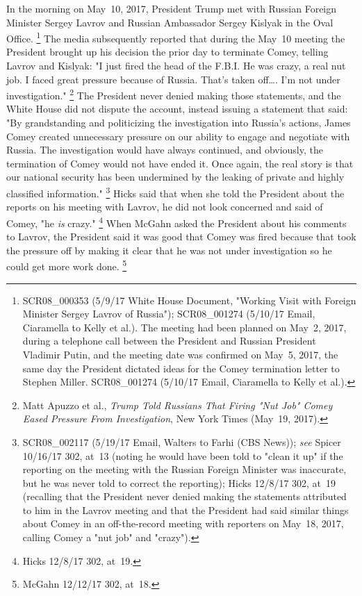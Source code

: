 In the morning on May~10, 2017, President Trump met with Russian Foreign Minister Sergey Lavrov and Russian Ambassador Sergey Kislyak in the Oval Office.%
\footnote{SCR08\_000353 (5/9/17 White House Document, "Working Visit with Foreign Minister Sergey Lavrov of Russia");
SCR08\_001274 (5/10/17 Email, Ciaramella to Kelly et al.).
The meeting had been planned on May~2, 2017, during a telephone call between the President and Russian President Vladimir Putin, and the meeting date was confirmed on May~5, 2017, the same day the President dictated ideas for the Comey termination letter to Stephen Miller.
SCR08\_001274 (5/10/17 Email, Ciaramella to Kelly et al.).}
The media subsequently reported that during the May~10 meeting the President brought up his decision the prior day to terminate Comey, telling Lavrov and Kislyak:
"I just fired the head of the F.B.I\null.
He was crazy, a real nut job.
I faced great pressure because of Russia.
That's taken off\dots.
I'm not under investigation."%
\footnote{Matt Apuzzo et al., \textit{Trump Told Russians That Firing "Nut Job" Comey Eased Pressure From Investigation}, New York Times (May~19, 2017).}
The President never denied making those statements, and the White House did not dispute the account, instead issuing a statement that said:
"By grandstanding and politicizing the investigation into Russia's actions, James Comey created unnecessary pressure on our ability to engage and negotiate with Russia.
The investigation would have always continued, and obviously, the termination of Comey would not have ended it.
Once again, the real story is that our national security has been undermined by the leaking of private and highly classified information."%
\footnote{SCR08\_002117 (5/19/17 Email, Walters to Farhi (CBS News));
\textit{see} Spicer 10/16/17 302, at~13 (noting he would have been told to "clean it up" if the reporting on the meeting with the Russian Foreign Minister was inaccurate, but he was never told to correct the reporting);
Hicks 12/8/17 302, at~19 (recalling that the President never denied making the statements attributed to him in the Lavrov meeting and that the President had said similar things about Comey in an off-the-record meeting with reporters on May~18, 2017, calling Comey a "nut job" and "crazy").}
Hicks said that when she told the President about the reports on his meeting with Lavrov, he did not look concerned and said of Comey, "he \textit{is} crazy."%
\footnote{Hicks 12/8/17 302, at~19.}
When McGahn asked the President about his comments to Lavrov, the President said it was good that Comey was fired because that took the pressure off by making it clear that he was not under investigation so he could get more work done.%
\footnote{McGahn 12/12/17 302, at~18.}

